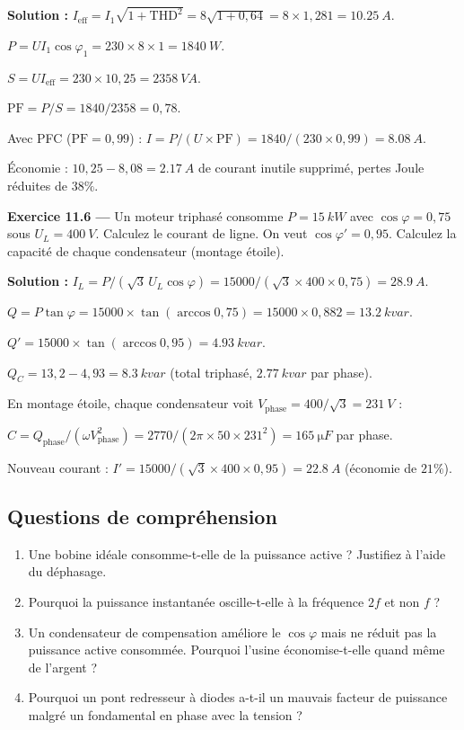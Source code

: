 \documentclass[12pt,a4paper,twoside]{book}
\begin{document}
\begin{pratique}
\textbf{Solution :} $I_{\text{eff}} = I_1\sqrt{1+\text{THD}^2} = 8\sqrt{1+0{,}64} = 8\times1{,}281 = \SI{10.25}{A}$.

$P = UI_1\cos\varphi_1 = 230\times8\times1 = \SI{1840}{W}$.

$S = UI_{\text{eff}} = 230\times10{,}25 = \SI{2358}{VA}$.

$\text{PF} = P/S = 1840/2358 = 0{,}78$.

Avec PFC ($\text{PF} = 0{,}99$) : $I = P/(U\times\text{PF}) = 1840/(230\times0{,}99) = \SI{8.08}{A}$.

Économie : $10{,}25 - 8{,}08 = \SI{2.17}{A}$ de courant inutile supprimé, pertes Joule réduites de $38\%$.
\end{pratique}

\textbf{Exercice 11.6 ---} Un moteur triphasé consomme $P = \SI{15}{kW}$ avec $\cos\varphi = 0{,}75$ sous $U_L = \SI{400}{V}$. Calculez le courant de ligne. On veut $\cos\varphi' = 0{,}95$. Calculez la capacité de chaque condensateur (montage étoile).

\begin{pratique}
\textbf{Solution :} $I_L = P/(\sqrt{3}\,U_L\cos\varphi) = 15000/(\sqrt{3}\times400\times0{,}75) = \SI{28.9}{A}$.

$Q = P\tan\varphi = 15000\times\tan(\arccos 0{,}75) = 15000\times0{,}882 = \SI{13.2}{kvar}$.

$Q' = 15000\times\tan(\arccos 0{,}95) = \SI{4.93}{kvar}$.

$Q_C = 13{,}2 - 4{,}93 = \SI{8.3}{kvar}$ (total triphasé, $\SI{2.77}{kvar}$ par phase).

En montage étoile, chaque condensateur voit $V_{\text{phase}} = 400/\sqrt{3} = \SI{231}{V}$ :

$C = Q_{\text{phase}}/(\omega V_{\text{phase}}^2) = 2770/(2\pi\times50\times231^2) = \SI{165}{\micro F}$ par phase.

Nouveau courant : $I' = 15000/(\sqrt{3}\times400\times0{,}95) = \SI{22.8}{A}$ (économie de $21\%$).
\end{pratique}

\subsection*{Questions de compréhension}

\begin{enumerate}[nosep]
\item Une bobine idéale consomme-t-elle de la puissance active ? Justifiez à l'aide du déphasage.
\item Pourquoi la puissance instantanée oscille-t-elle à la fréquence $2f$ et non $f$ ?
\item Un condensateur de compensation améliore le $\cos\varphi$ mais ne réduit pas la puissance active consommée. Pourquoi l'usine économise-t-elle quand même de l'argent ?
\item Pourquoi un pont redresseur à diodes a-t-il un mauvais facteur de puissance malgré un fondamental en phase avec la tension ?
\end{enumerate}
\end{document}
